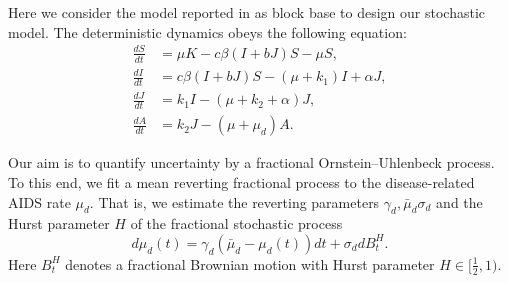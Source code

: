 Here we consider the model reported in \cite{Cai2009} as block base to
design our stochastic model. The deterministic dynamics obeys the following 
equation:
%
\begin{equation}
    \begin{aligned}
        \frac{dS}{dt} &=
            \mu K - c \beta (I + b J) S - \mu S,
            \\
        \frac{dI}{dt} &=
            c \beta (I + b J) S - (\mu + k_1)  I + \alpha J,
            \\
        \frac{dJ}{dt} &=
            k_1 I - (\mu + k_2 + \alpha) J,
            \\
        \frac{dA}{dt} &=
            k_2 J - (\mu + \mu_d) A.
    \end{aligned}
\end{equation}

Our aim is to quantify uncertainty by a fractional Ornstein–Uhlenbeck 
process. To this end, we fit a mean reverting fractional process to the 
disease-related AIDS rate $\mu_d$. That is, we estimate the reverting 
parameters $\gamma_d, \bar{\mu}_d 
\sigma_d$ and the Hurst parameter $H$ of the fractional stochastic process
\begin{equation}\label{eqn:fOU}
    d \mu_d(t) = 
        \gamma_d \left( \bar{\mu}_d - \mu_d(t) \right) dt
        + \sigma_d dB_t^H.
\end{equation}
Here $B_t^H$ denotes a fractional Brownian motion with Hurst parameter
$H\in[\frac{1}{2}, 1)$.